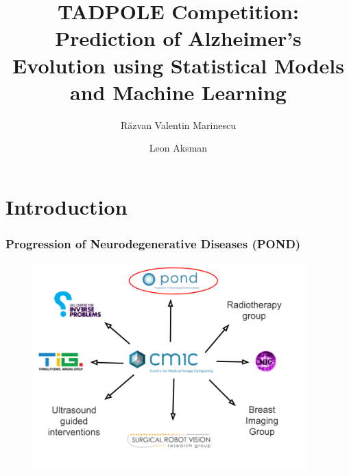 \documentclass[8pt,xcolor=table]{beamer}
\title{TADPOLE Competition: Prediction of Alzheimer's Evolution using Statistical Models and Machine Learning}
\author[Raz \and Danny \and Seb]{
R\u{a}zvan Valentin Marinescu\vspace{1em} \and Leon Aksman
}
\institute{\small{Centre for Medical Image Computing, University College London, UK}

\vspace{0em}
}
\date{}
\begin{document}
 
\section{Introduction}

\frame{\titlepage}
 



\begin{frame}
\frametitle{Progression of Neurodegenerative Diseases (POND)}

\begin{figure}
\centering
\includegraphics[height=8cm]{../pond_diagram} 
\end{figure}

\end{frame}
\end{document}
